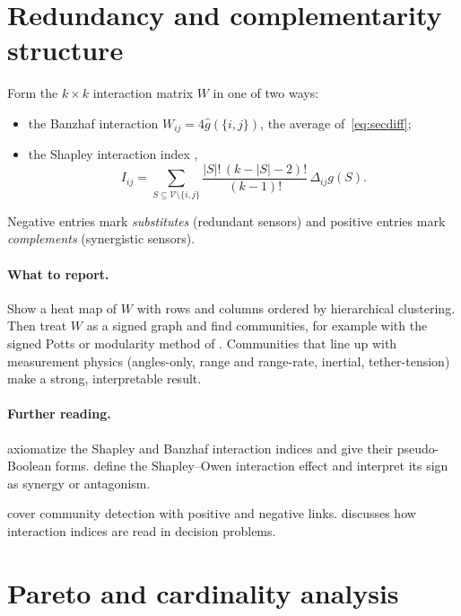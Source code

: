\documentclass[11pt]{article}
\newcommand{\V}{\mathcal{V}}
\begin{document}
\section{Redundancy and complementarity structure}\label{sec:network}

Form the $k\times k$ interaction matrix $W$ in one of two ways:
\begin{itemize}[itemsep=2pt]
  \item the Banzhaf interaction $W_{ij}=4\widehat{g}(\{i,j\})$, the average of~\eqref{eq:secdiff};
  \item the Shapley interaction index \parencite{GrabischRoubens1999},
        \[
          I_{ij}=\sum_{S\subseteq\V\setminus\{i,j\}}\frac{|S|!\,(k-|S|-2)!}{(k-1)!}\,\Delta_{ij}g(S).
        \]
\end{itemize}
Negative entries mark \emph{substitutes} (redundant sensors) and positive entries mark \emph{complements} (synergistic sensors).

\paragraph{What to report.}
Show a heat map of $W$ with rows and columns ordered by hierarchical clustering.
Then treat $W$ as a signed graph and find communities, for example with the signed Potts or modularity method of \textcite{TraagBruggeman2009}.
Communities that line up with measurement physics (angles-only, range and range-rate, inertial, tether-tension) make a strong, interpretable result.

\paragraph{Further reading.}
\begin{reading}
  \item[Mathematics.] \textcite{GrabischRoubens1999} axiomatize the Shapley and Banzhaf interaction indices and give their pseudo-Boolean forms.
        \textcite{RabittiBorgonovo2019} define the Shapley--Owen interaction effect and interpret its sign as synergy or antagonism.
  \item[Applying it.] \textcite{TraagBruggeman2009} cover community detection with positive and negative links.
        \textcite{Grabisch2016} discusses how interaction indices are read in decision problems.
\end{reading}

\section{Pareto and cardinality analysis}\label{sec:pareto}
\end{document}
